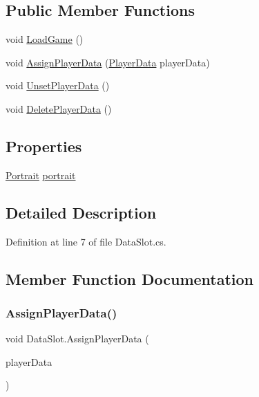 \subsection*{Public Member Functions}
\begin{DoxyCompactItemize}
\item 
void \mbox{\hyperlink{class_data_slot_a8c5e92e015138b1ec785465db9ff65a6}{Load\+Game}} ()
\item 
void \mbox{\hyperlink{class_data_slot_a104284ff9c03da56e871e2f39d345e0b}{Assign\+Player\+Data}} (\mbox{\hyperlink{class_player_data}{Player\+Data}} player\+Data)
\item 
void \mbox{\hyperlink{class_data_slot_a2d8c55c9436701f7d2a12ab7388dcdec}{Unset\+Player\+Data}} ()
\item 
void \mbox{\hyperlink{class_data_slot_aae68b8b9d2f07c2d634e82493d29c05d}{Delete\+Player\+Data}} ()
\end{DoxyCompactItemize}
\subsection*{Properties}
\begin{DoxyCompactItemize}
\item 
\mbox{\hyperlink{class_portrait}{Portrait}} \mbox{\hyperlink{class_data_slot_abe2454953aa5b018407db6ebbdc18083}{portrait}}
\end{DoxyCompactItemize}


\subsection{Detailed Description}


Definition at line 7 of file Data\+Slot.\+cs.



\subsection{Member Function Documentation}
\mbox{\label{class_data_slot_a104284ff9c03da56e871e2f39d345e0b}} 
\subsubsection{\texorpdfstring{AssignPlayerData()}{AssignPlayerData()}}
{\footnotesize\ttfamily void Data\+Slot.\+Assign\+Player\+Data (\begin{DoxyParamCaption}\item[{\mbox{\hyperlink{class_player_data}{Player\+Data}}}]{player\+Data }\end{DoxyParamCaption})}



